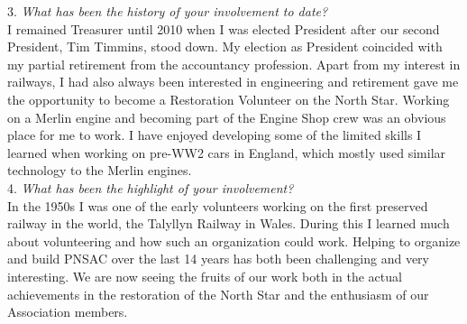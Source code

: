 \begin{multicols}{2}
3. \textit{What has been the history of your involvement to date?}\\

I remained Treasurer until 2010 when I was elected President after our second
President, Tim Timmins, stood down. My election as President coincided with my
partial retirement from the accountancy profession. Apart from my interest in
railways, I had also always been interested in engineering and retirement gave
me the opportunity to become a Restoration Volunteer on the North Star. Working
on a Merlin engine and becoming part of the Engine Shop crew was an obvious
place for me to work. I have enjoyed developing some of the limited skills I
learned when working on pre-WW2 cars in England, which mostly used similar
technology to the Merlin engines.\\



4. \textit{What has been the highlight of your involvement?}\\

In the 1950s I was one of the early volunteers working on the first preserved
railway in the world, the Talyllyn Railway in Wales. During this I learned much
about volunteering and how such an organization could work. Helping to organize
and build PNSAC over the last 14 years has both been challenging and very
interesting. We are now seeing the fruits of our work both in the actual
achievements in the restoration of the North Star and the enthusiasm of our
Association members.\\


\end{multicols}
